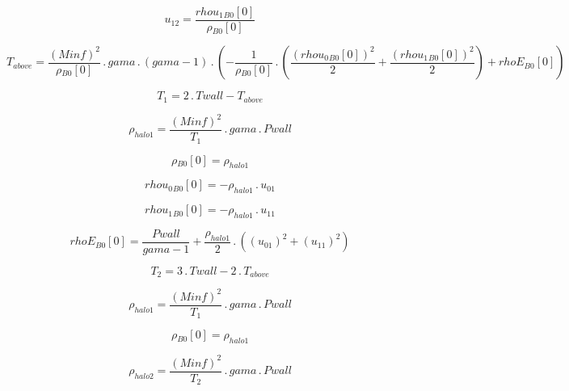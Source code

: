 \documentclass{article}
\begin{document}
\begin{dmath}u_{12} = \frac{{rhou_{1}{_{B0}}}[{0}]}{{\rho{_{B0}}}[{0}]}\end{dmath}

\begin{dmath}T_{above} = \frac{\left(Minf \right)^{2}}{{\rho{_{B0}}}[{0}]} \,.\, gama \,.\, \left(gama - 1\right) \,.\, \left(- \frac{1}{{\rho{_{B0}}}[{0}]} \,.\, \left(\frac{\left({rhou_{0}{_{B0}}}[{0}] \right)^{2}}{2} + 
\frac{\left({rhou_{1}{_{B0}}}[{0}] \right)^{2}}{2}\right) + {rhoE{_{B0}}}[{0}]\right)\end{dmath}

\begin{dmath}T_{1} = 2 \,.\, Twall - T_{above}\end{dmath}

\begin{dmath}\rho_{halo 1} = \frac{\left(Minf \right)^{2}}{T_{1}} \,.\, gama \,.\, Pwall\end{dmath}

\begin{dmath}{\rho{_{B0}}}[{0}] = \rho_{halo 1}\end{dmath}

\begin{dmath}{rhou_{0}{_{B0}}}[{0}] = - \rho_{halo 1} \,.\, u_{01}\end{dmath}

\begin{dmath}{rhou_{1}{_{B0}}}[{0}] = - \rho_{halo 1} \,.\, u_{11}\end{dmath}

\begin{dmath}{rhoE{_{B0}}}[{0}] = \frac{Pwall}{gama - 1} + \frac{\rho_{halo 1}}{2} \,.\, \left(\left(u_{01} \right)^{2} + \left(u_{11} \right)^{2}\right)\end{dmath}

\begin{dmath}T_{2} = 3 \,.\, Twall - 2 \,.\, T_{above}\end{dmath}

\begin{dmath}\rho_{halo 1} = \frac{\left(Minf \right)^{2}}{T_{1}} \,.\, gama \,.\, Pwall\end{dmath}

\begin{dmath}{\rho{_{B0}}}[{0}] = \rho_{halo 1}\end{dmath}

\begin{dmath}\rho_{halo 2} = \frac{\left(Minf \right)^{2}}{T_{2}} \,.\, gama \,.\, Pwall\end{dmath}
\end{document}
